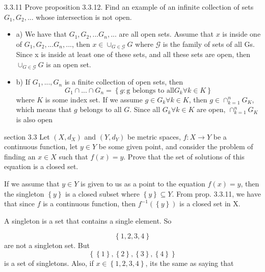 \documentclass[a4paper,norsk]{article}
\begin{document}
\begin{oppgavebox}{3.3.11}{}
Prove proposition 3.3.12. Find an example of an infinite collection of sets $ G_1, G_2, ... $ whose intersection is not open.

\begin{proofbox}{}{}
  \begin{itemize}
    \item a) We have that $ G_1, G_2, ... G_n, ... $   are all open sets. Assume that $ x  $ is inside one of $ G_1, G_2, ... G_n, ... $, then $ x \in  \cup_{G \in \mathcal{G}} G$ where $ \mathcal{G} $ is the family of sets of all Gs. Since x is inside at least one of these sets, and all these sets are open, then $\cup_{G \in \mathcal{G}} G$ is an open set.
    \item b) If $ G_1, ..., G_n $ is a finite collection of open sets, then
    \[
        G_1 \cap ... \cap G_n = \left\{ g : \text{g belongs to all} G_k \forall k \in K \right\} 
    \]
    where $ K $ is some index set. If we assume $ g \in G_k  \forall k \in K$, then $ g \in \cap_{k=1}^{n} G_K $, which means that $ g $ belongs to all $ G $. Since all $ G_k \forall k \in K $ are open, $ \cap_{k=1}^{n} G_K $ is also open
    
  \end{itemize}
\end{proofbox}
\end{oppgavebox}

\begin{oppgavebox}{section 3.3}{}
Let $ \left( X, d_X \right)  $ and $ \left( Y, d_Y \right)  $ be metric spaces, $ f : X \rightarrow Y $ be a continuous function, let $ y \in Y $ be some given point, and consider the problem of finding an $ x \in X $ such that $ f(x) = y $. Prove that the set of solutions of this equation is a closed set.

\begin{proofbox}{}{}
  If we assume that $ y \in Y $ is given to us as a point to the equation $ f(x) = y $, then the singleton $ \left\{ y \right\}  $  is a closed subset where $ \left\{ y \right\} \subseteq Y $. From prop. 3.3.11, we have that since $ f $ is a continuous function, then $ f^{-1} \left( \left\{ y \right\}  \right)  $ is a closed set in X.
\end{proofbox}
\end{oppgavebox}

A singleton is a set that contains a single element. So

\[
    \left\{ 1, 2, 3, 4 \right\} 
\]
are not a singleton set. But
\[
    \left\{ \left\{ 1 \right\} , \left\{ 2 \right\} , \left\{ 3 \right\} , \left\{ 4 \right\}  \right\} 
\]
is a set of singletons. Also, if $ x \in \left\{ 1, 2, 3, 4 \right\}  $, its the same as saying that 
\end{document}
